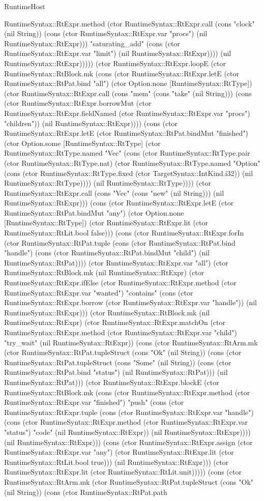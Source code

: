\begin{lexlean}{RuntimeHost}
\begin{semanticmodule}
{RuntimeSyntax::RtExpr.method (ctor RuntimeSyntax::RtExpr.call (cons "clock" (nil String)) (cons (ctor RuntimeSyntax::RtExpr.var "procs") (nil RuntimeSyntax::RtExpr))) "saturating_add" (cons (ctor RuntimeSyntax::RtExpr.var "limit") (nil RuntimeSyntax::RtExpr)))) (nil RuntimeSyntax::RtExpr))))) (ctor RuntimeSyntax::RtExpr.loopE (ctor RuntimeSyntax::RtBlock.mk (cons (ctor RuntimeSyntax::RtExpr.letE (ctor RuntimeSyntax::RtPat.bind "all") (ctor Option.none [RuntimeSyntax::RtType]) (ctor RuntimeSyntax::RtExpr.call (cons "mem" (cons "take" (nil String))) (cons (ctor RuntimeSyntax::RtExpr.borrowMut (ctor RuntimeSyntax::RtExpr.fieldNamed (ctor RuntimeSyntax::RtExpr.var "procs") "children")) (nil RuntimeSyntax::RtExpr)))) (cons (ctor RuntimeSyntax::RtExpr.letE (ctor RuntimeSyntax::RtPat.bindMut "finished") (ctor Option.some [RuntimeSyntax::RtType] (ctor RuntimeSyntax::RtType.named "Vec" (cons (ctor RuntimeSyntax::RtType.pair (ctor RuntimeSyntax::RtType.nat) (ctor RuntimeSyntax::RtType.named "Option" (cons (ctor RuntimeSyntax::RtType.fixed (ctor TargetSyntax::IntKind.i32)) (nil RuntimeSyntax::RtType)))) (nil RuntimeSyntax::RtType)))) (ctor RuntimeSyntax::RtExpr.call (cons "Vec" (cons "new" (nil String))) (nil RuntimeSyntax::RtExpr))) (cons (ctor RuntimeSyntax::RtExpr.letE (ctor RuntimeSyntax::RtPat.bindMut "any") (ctor Option.none [RuntimeSyntax::RtType]) (ctor RuntimeSyntax::RtExpr.lit (ctor RuntimeSyntax::RtLit.bool false))) (cons (ctor RuntimeSyntax::RtExpr.forIn (ctor RuntimeSyntax::RtPat.tuple (cons (ctor RuntimeSyntax::RtPat.bind "handle") (cons (ctor RuntimeSyntax::RtPat.bindMut "child") (nil RuntimeSyntax::RtPat)))) (ctor RuntimeSyntax::RtExpr.var "all") (ctor RuntimeSyntax::RtBlock.mk (nil RuntimeSyntax::RtExpr) (ctor RuntimeSyntax::RtExpr.ifElse (ctor RuntimeSyntax::RtExpr.method (ctor RuntimeSyntax::RtExpr.var "wanted") "contains" (cons (ctor RuntimeSyntax::RtExpr.borrow (ctor RuntimeSyntax::RtExpr.var "handle")) (nil RuntimeSyntax::RtExpr))) (ctor RuntimeSyntax::RtBlock.mk (nil RuntimeSyntax::RtExpr) (ctor RuntimeSyntax::RtExpr.matchOn (ctor RuntimeSyntax::RtExpr.method (ctor RuntimeSyntax::RtExpr.var "child") "try_wait" (nil RuntimeSyntax::RtExpr)) (cons (ctor RuntimeSyntax::RtArm.mk (ctor RuntimeSyntax::RtPat.tupleStruct (cons "Ok" (nil String)) (cons (ctor RuntimeSyntax::RtPat.tupleStruct (cons "Some" (nil String)) (cons (ctor RuntimeSyntax::RtPat.bind "status") (nil RuntimeSyntax::RtPat))) (nil RuntimeSyntax::RtPat))) (ctor RuntimeSyntax::RtExpr.blockE (ctor RuntimeSyntax::RtBlock.mk (cons (ctor RuntimeSyntax::RtExpr.method (ctor RuntimeSyntax::RtExpr.var "finished") "push" (cons (ctor RuntimeSyntax::RtExpr.tuple (cons (ctor RuntimeSyntax::RtExpr.var "handle") (cons (ctor RuntimeSyntax::RtExpr.method (ctor RuntimeSyntax::RtExpr.var "status") "code" (nil RuntimeSyntax::RtExpr)) (nil RuntimeSyntax::RtExpr)))) (nil RuntimeSyntax::RtExpr))) (cons (ctor RuntimeSyntax::RtExpr.assign (ctor RuntimeSyntax::RtExpr.var "any") (ctor RuntimeSyntax::RtExpr.lit (ctor RuntimeSyntax::RtLit.bool true))) (nil RuntimeSyntax::RtExpr))) (ctor RuntimeSyntax::RtExpr.lit (ctor RuntimeSyntax::RtLit.unit))))) (cons (ctor RuntimeSyntax::RtArm.mk (ctor RuntimeSyntax::RtPat.tupleStruct (cons "Ok" (nil String)) (cons (ctor RuntimeSyntax::RtPat.path }
\end{semanticmodule}
\end{lexlean}
